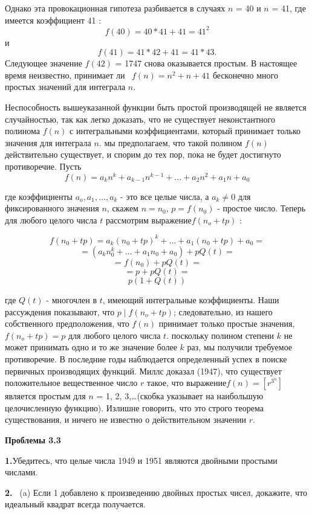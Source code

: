 \documentclass[11pt]{article}
\begin{document}
Однако эта провокационная гипотеза разбивается в случаях $n$ = 40 и $n$ = 41, где имеется коэффициент 41 :
\[
f(40) = 40 * 41 + 41 = 41^2
\]
и
\[
f (41) = 41 * 42 + 41 = 41 * 43.
\]
Следующее значение $f(42)$ = 1747 снова оказывается простым. В настоящее время неизвестно, принимает ли ~$f(n) = n^2+ n + 41$ бесконечно много простых значений для интеграла $n$.

Неспособность вышеуказанной функции быть простой производящей не является случайностью, так как легко доказать, что не существует неконстантного полинома $f(n)$ с интегральными коэффициентами, который принимает только значения для интеграла $n$. мы предполагаем, что такой полином $f(n)$ действительно существует, и спорим до тех пор, пока не будет достигнуто противоречие. Пусть 
\[
f(n)=a_kn^k+a_{k-1}n^{k-1}+\ldots+a_2n^2+a_1n+a_0
\]

где коэффициенты $a_o, a_1,\ldots, a_k$ - это все целые числа, а $a_k \ne 0$ для фиксированного значения $n$, скажем $n = n_0$, $ p=f(n_0)$ - простое число. Теперь для любого целого числа $t$ рассмотрим выражение$ f(n_o+tp)$ :

\[
f(n_0+tp)=a_k(n_0+tp)^k+\ldots+a_1(n_0+tp)+a_0=
\]
\[
=(a_kn_0^{k}+\ldots+a_1n_0+a_0)+pQ(t)= 
\]
\[
=f(n_0)+pQ(t)=
\]
\[
=p+pQ(t)=
\]
\[
p(1+Q(t))
\]

где $Q(t)$ - многочлен в $t$, имеющий интегральные коэффициенты. Наши рассуждения показывают, что $p\mid f(n_o + tp)$; следовательно, из нашего собственного предположения, что $f(n)$ принимает только простые значения, $f (n_o+tp) =p$ для любого целого числа $t$. поскольку полином степени $k$ не может принимать одно и то же значение более $k$ раз, мы получили требуемое противоречие.
В последние годы наблюдается определенный успех в поиске первичных производящих функций. Миллс доказал (1947), что существует положительное вещественное число $r$ такое, что выражение$f(n) = [r^{3^n}]$ является простым для $n$ = 1, 2, 3,\ldots (скобка указывает на наибольшую целочисленную функцию). Излишне говорить, что это строго теорема существования, и ничего не известно о действительном значении $r$.

\begin{center}
\textbf{\large{Проблемы 3.3}}
\end{center}

\textbf{1.}Убедитесь, что целые числа 1949 и 1951 являются двойными простыми числами.

\textbf{2.  } ~(a) Если 1 добавлено к произведению двойных простых чисел, докажите, что идеальный квадрат всегда получается.
\end{document}
